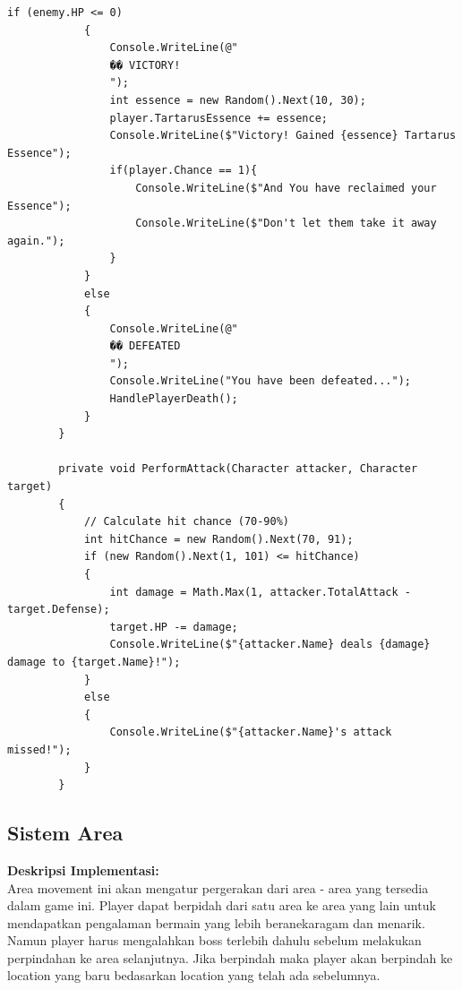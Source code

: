 \documentclass[12pt]{article}
\begin{document}
\begin{lstlisting}[language=CSharp, caption=Implementasi Combat System dengan Attack]
            if (enemy.HP <= 0)
            {
                Console.WriteLine(@"
                �� VICTORY!
                ");
                int essence = new Random().Next(10, 30);
                player.TartarusEssence += essence;
                Console.WriteLine($"Victory! Gained {essence} Tartarus Essence");
                if(player.Chance == 1){
                    Console.WriteLine($"And You have reclaimed your Essence");
                    Console.WriteLine($"Don't let them take it away again.");
                }
            }
            else
            {
                Console.WriteLine(@"
                �� DEFEATED
                ");
                Console.WriteLine("You have been defeated...");
                HandlePlayerDeath();
            }
        }

        private void PerformAttack(Character attacker, Character target)
        {
            // Calculate hit chance (70-90%)
            int hitChance = new Random().Next(70, 91);
            if (new Random().Next(1, 101) <= hitChance)
            {
                int damage = Math.Max(1, attacker.TotalAttack - target.Defense);
                target.HP -= damage;
                Console.WriteLine($"{attacker.Name} deals {damage} damage to {target.Name}!");
            }
            else
            {
                Console.WriteLine($"{attacker.Name}'s attack missed!");
            }
        }
\end{lstlisting}


\subsection{Sistem Area}
\textbf{Deskripsi Implementasi:} \\ 
Area movement ini akan mengatur pergerakan dari area - area yang tersedia dalam game ini. Player dapat berpidah dari satu area ke area yang lain untuk mendapatkan pengalaman bermain yang lebih beranekaragam dan menarik. Namun player harus mengalahkan boss terlebih dahulu sebelum melakukan perpindahan ke area selanjutnya. Jika berpindah maka player akan berpindah ke location yang baru bedasarkan location yang telah ada sebelumnya.
\end{document}
